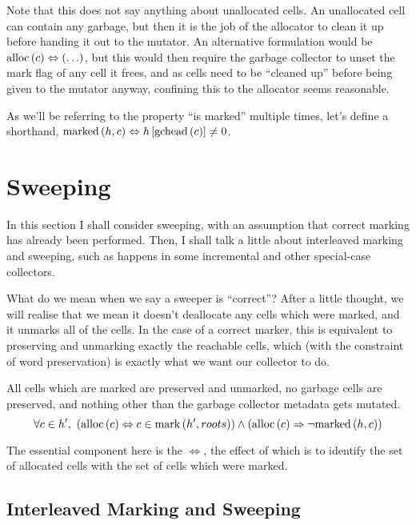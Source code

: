 Note that this does not say anything about unallocated
\glspl{cell}. An unallocated \gls{cell} can contain any garbage, but
then it is the job of the allocator to clean it up before handing it
out to the \gls{mutator}. An alternative formulation would be
$\mathrm{alloc}\left(c\right) \Leftrightarrow \left(\ldots\right)$, but this would then require the
\gls{garbage collector} to unset the mark flag of any \gls{cell} it
frees, and as \glspl{cell} need to be ``cleaned up'' before being
given to the \gls{mutator} anyway, confining this to the allocator
seems reasonable.

As we'll be referring to the property ``is marked'' multiple times,
let's define a shorthand, $\mathrm{marked}\left(h, c\right) \Leftrightarrow h\left[\mathrm{gchead}\left(c\right)\right]
\neq 0$.

\section{Sweeping}
\label{sec:marksweep-sweeping}

In this section I shall consider sweeping, with an assumption that
correct marking has already been performed. Then, I shall talk a
little about interleaved marking and sweeping, such as happens in some
incremental and other special-case collectors.

What do we mean when we say a sweeper is ``correct''? After a little
thought, we will realise that we mean it doesn't deallocate any
\glspl{cell} which were marked, and it unmarks all of the
\glspl{cell}. In the case of a correct marker, this is equivalent to
preserving and unmarking exactly the reachable \glspl{cell}, which
(with the constraint of word preservation) is exactly what we want our
\gls{collector} to do.

\begin{definition}
  \label{def:ms-correct-sweeping}
  All cells which are marked are preserved and unmarked, no garbage
  cells are preserved, and nothing other than the garbage collector
  metadata gets mutated.
  \[\forall c \in h',\ \left(\mathrm{alloc}\left(c\right) \Leftrightarrow c \in
    \mathrm{mark}\left(h', roots\right)\right) \land \left(\mathrm{alloc}\left(c\right) \Rightarrow
    \lnot\mathrm{marked}\left(h, c\right)\right)\]
\end{definition}

The essential component here is the $\iff$, the effect of which is to
identify the set of allocated cells with the set of cells which were
marked.

\subsection{Interleaved Marking and Sweeping}
\label{sec:marksweep-sweeping-interleaved}

